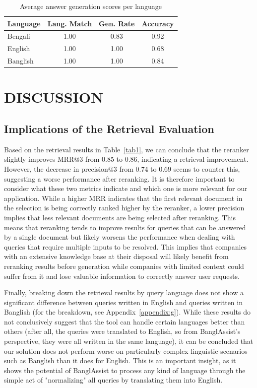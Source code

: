 \documentclass[sigconf]{acmart}
\begin{document}
\begin{table}
    \caption{Average answer generation scores per language}
    \label{tab2}
    \begin{tabular}{lccc}
        \toprule
        \textbf{Language} & \textbf{Lang. Match} & \textbf{Gen. Rate} & \textbf{Accuracy}\\
        \toprule
        Bengali & 1.00 & 0.83 & 0.92\\
        English & 1.00 & 1.00 & 0.68\\
        Banglish & 1.00 & 1.00 & 0.84\\
        \bottomrule
    \end{tabular}
\end{table}

\raggedbottom

\section{DISCUSSION}

\subsection{Implications of the Retrieval Evaluation}

Based on the retrieval results in Table~\ref{tab1}, we can conclude that the reranker slightly improves MRR@3 from 0.85 to 0.86, indicating a retrieval improvement. However, the decrease in precision@3 from 0.74 to 0.69 seems to counter this, suggesting a worse performance after reranking. It is therefore important to consider what these two metrics indicate and which one is more relevant for our application. While a higher MRR indicates that the first relevant document in the selection is being correctly ranked higher by the reranker, a lower precision implies that less relevant documents are being selected after reranking. This means that reranking tends to improve results for queries that can be answered by a single document but likely worsens the performance when dealing with queries that require multiple inputs to be resolved. This implies that companies with an extensive knowledge base at their disposal will likely benefit from reranking results before generation while companies with limited context could suffer from it and lose valuable information to correctly answer user requests.

Finally, breaking down the retrieval results by query language does not show a significant difference between queries written in English and queries written in Banglish (for the breakdown, see Appendix~\ref{appendix:g}). While these results do not conclusively suggest that the tool can handle certain languages better than others (after all, the queries were translated to English, so from BanglAssist's perspective, they were all written in the same language), it can be concluded that our solution does not perform worse on particularly complex linguistic scenarios such as Banglish than it does for English. This is an important insight, as it shows the potential of BanglAssist to process any kind of language through the simple act of "normalizing" all queries by translating them into English.
\end{document}
